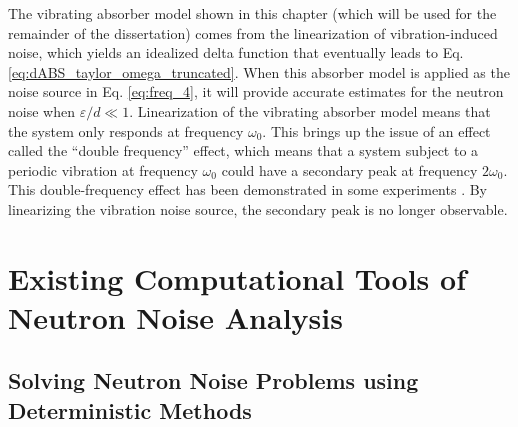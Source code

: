 The vibrating absorber model shown in this chapter (which will be used for the remainder of the dissertation) comes from the linearization of vibration-induced noise, which yields an idealized delta function that eventually leads to Eq. \ref{eq:dABS_taylor_omega_truncated}.  When this absorber model is applied as the noise source in Eq. \ref{eq:freq_4}, it will provide accurate estimates for the neutron noise when $\varepsilon/d \ll 1$. Linearization of the vibrating absorber model means that the system only responds at frequency $\omega_0$. This brings up the issue of an effect called the “double frequency” effect, which means that a system subject to a periodic vibration at frequency $\omega_0$ could have a secondary peak at frequency $2\omega_0$. This double-frequency effect has been demonstrated in some experiments \cite{luciaCorrelationNeutronNoise1973}. By linearizing the vibration noise source, the secondary peak is no longer observable.  

\section{Existing Computational Tools of Neutron Noise Analysis}
\label{sec:noise_tools}

\subsection{Solving Neutron Noise Problems using Deterministic Methods}

